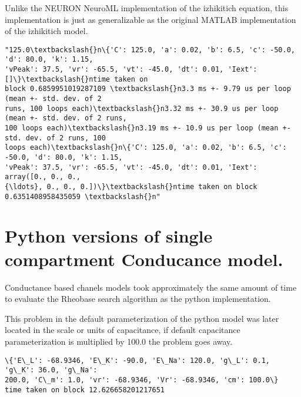 Unlike the NEURON NeuroML implementation of the izhikitich equation,
this implementation is just as generalizable as the original MATLAB
implementation of the izhikitich model.

            \begin{tcolorbox}[breakable, size=fbox, boxrule=.5pt, pad at break*=1mm, opacityfill=0]
\begin{Verbatim}[commandchars=\\\{\}]
"125.0\textbackslash{}n\{'C': 125.0, 'a': 0.02, 'b': 6.5, 'c': -50.0, 'd': 80.0, 'k': 1.15,
'vPeak': 37.5, 'vr': -65.5, 'vt': -45.0, 'dt': 0.01, 'Iext': []\}\textbackslash{}ntime taken on
block 0.6859951019287109 \textbackslash{}n3.3 ms +- 9.79 us per loop (mean +- std. dev. of 2
runs, 100 loops each)\textbackslash{}n3.32 ms +- 30.9 us per loop (mean +- std. dev. of 2 runs,
100 loops each)\textbackslash{}n3.19 ms +- 10.9 us per loop (mean +- std. dev. of 2 runs, 100
loops each)\textbackslash{}n\{'C': 125.0, 'a': 0.02, 'b': 6.5, 'c': -50.0, 'd': 80.0, 'k': 1.15,
'vPeak': 37.5, 'vr': -65.5, 'vt': -45.0, 'dt': 0.01, 'Iext': array([0., 0., 0.,
{\ldots}, 0., 0., 0.])\}\textbackslash{}ntime taken on block 0.6351408958435059 \textbackslash{}n"
\end{Verbatim}
\end{tcolorbox}
        
    \hypertarget{python-versions-of-single-compartment-conducance-model.}{%
\section{Python versions of single compartment Conducance
model.}\label{python-versions-of-single-compartment-conducance-model.}}

Conductance based chanels models took approximately the same amount of
time to evaluate the Rheobase search algorithm as the python
implementation.

This problem in the default parameterization of the python model was
later located in the scale or units of capacitance, if default
capacitance parameterization is multiplied by 100.0 the problem goes
away.

    \begin{Verbatim}[commandchars=\\\{\}]
\{'E\_L': -68.9346, 'E\_K': -90.0, 'E\_Na': 120.0, 'g\_L': 0.1, 'g\_K': 36.0, 'g\_Na':
200.0, 'C\_m': 1.0, 'vr': -68.9346, 'Vr': -68.9346, 'cm': 100.0\}
time taken on block 12.626658201217651
    \end{Verbatim}

